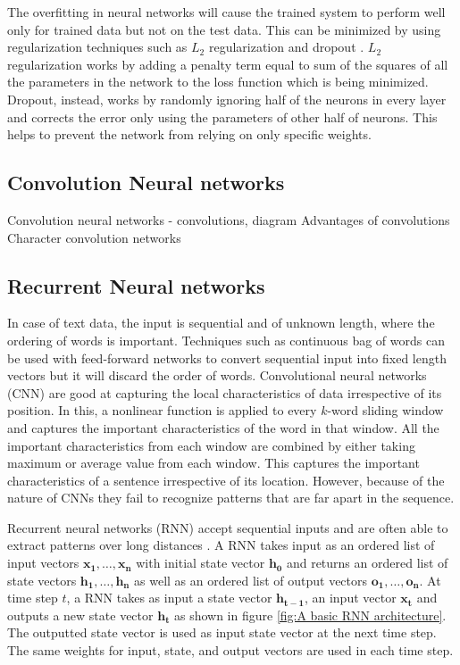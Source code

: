 \documentclass[a4paper, 11pt]{article}
\begin{document}
The overfitting in neural networks will cause the trained system to perform well only for trained data but not on the test data. This can be minimized by using regularization techniques such as $L_2$ regularization and dropout \parencite{Hinton2012}. $L_2$ regularization works by adding a penalty term equal to sum of the squares of all the parameters in the network to the loss function which is being minimized. Dropout, instead, works by randomly ignoring half of the neurons in every layer and corrects the error only using the parameters of other half of neurons. This helps to prevent the network from relying on only specific weights.

\subsection{Convolution Neural networks}

Convolution neural networks - convolutions, diagram
Advantages of convolutions
Character convolution networks

\subsection{Recurrent Neural networks}


In case of text data, the input is sequential and of unknown length, where the ordering of words is important. Techniques such as continuous bag of words \parencite{DBLP:journals/corr/abs-1301-3781} can be used with feed-forward networks to convert sequential input into fixed length vectors but it will discard the order of words. Convolutional neural networks (CNN) \parencite{Bengio1997} are good at capturing the local characteristics of data irrespective of its position. In this, a nonlinear function is applied to every $k$-word sliding window and captures the important characteristics of the word in that window. All the important characteristics from each window are combined by either taking maximum or average value from each window. This captures the important characteristics of a sentence irrespective of its location. However, because of the nature of CNNs they fail to recognize patterns that are far apart in the sequence.

Recurrent neural networks (RNN) accept sequential inputs and are often able to extract patterns over long distances \parencite{Elman}. A RNN takes input as an ordered list of input vectors $\mathrm{\mathbf{x_1},\dots,\mathbf{x_n}}$ with initial state vector $\mathbf{h_0}$ and returns an ordered list of state vectors $\mathrm{\mathbf{h_1},\dots,\mathbf{h_n}}$ as well as an ordered list of output vectors $\mathrm{\mathbf{o_1},\dots,\mathbf{o_n}}$. At time step $t$, a RNN takes as input a state vector $\mathbf{h_{t-1}}$, an input vector $\mathbf{x_{t}}$ and outputs a new state vector $\mathbf{h_{t}}$ as shown in figure \ref{fig:A basic RNN architecture}. The outputted state vector is used as input state vector at the next time step. The same weights for input, state, and output vectors are used in each time step.  
\end{document}

